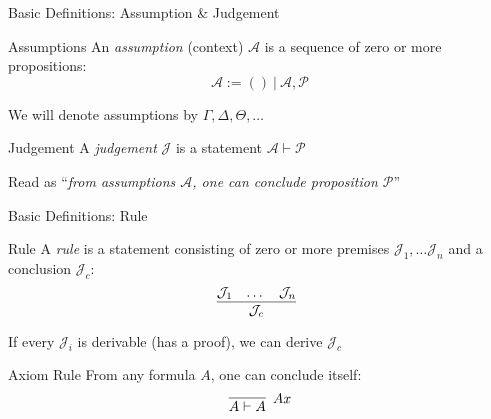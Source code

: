 \documentclass{beamer}
\begin{document}
\begin{frame}{Basic Definitions: Assumption \& Judgement}
	\begin{block}{Assumptions}
		An \textit{assumption} (context) $\mathcal{A}$ is a sequence of zero or more propositions:
		\[
			\mathcal{A} := \left( \right) \ | \ \mathcal{A}, \mathcal{P}
		\]
	\end{block}
	
	\begin{flushright}
		\small
		We will denote assumptions by $\Gamma, \Delta, \Theta, \dots$
	\end{flushright}
	
	\pause
	\begin{block}{Judgement}
		A \textit{judgement} $\mathcal{J}$ is a statement $\mathcal{A} \vdash \mathcal{P}$
	\end{block}
	
	\begin{flushright}
		\small 
		Read as ``\textit{from assumptions $\mathcal{A}$, one can conclude proposition $\mathcal{P}$}''
	\end{flushright}
\end{frame}

\begin{frame}{Basic Definitions: Rule}	
	\begin{block}{Rule}
	A \textit{rule} is a statement consisting of zero or more \alert{premises} $\mathcal{J}_1, \dots \mathcal{J}_n$ and a \alert{conclusion} $\mathcal{J}_c$:
	\[
		\infer[]{\mathcal{J}_c}{
		\mathcal{J}_1 
		&
		\dots 
		&
		\mathcal{J}_n
		}
	\]
	\end{block}
	\pause
	
	\begin{flushright}
		\small
		If every $\mathcal{J}_i$ is derivable (has a proof), we can derive $\mathcal{J}_c$
	\end{flushright}

	\begin{block}{Axiom Rule}
	From any formula $A$, one can conclude itself:
	\[
		\infer[Ax]{A \vdash A}{}
	\]
	
	\end{block}

\end{frame}
\end{document}
